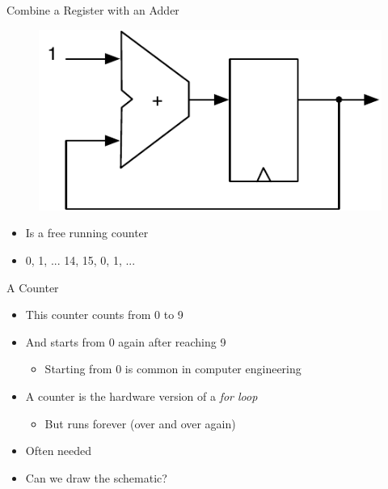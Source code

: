 \begin{frame}[fragile]{Combine a Register with an Adder}
\begin{figure}
  \includegraphics[scale=\scale]{../figures/counter}
\end{figure}
\begin{itemize}
\item Is a free running counter
\item 0, 1, ... 14, 15, 0, 1, ...
\end{itemize}
\end{frame}


\begin{frame}[fragile]{A Counter}
\begin{itemize}
\item This counter counts from 0 to 9
\item And starts from 0 again after reaching 9
\begin{itemize}
\item Starting from 0 is common in computer engineering
\end{itemize}
\item A counter is the hardware version of a \emph{for loop}
\begin{itemize}
\item But runs forever (over and over again)
\end{itemize}
\item Often needed
\item Can we draw the schematic?
\end{itemize}
\end{frame}

